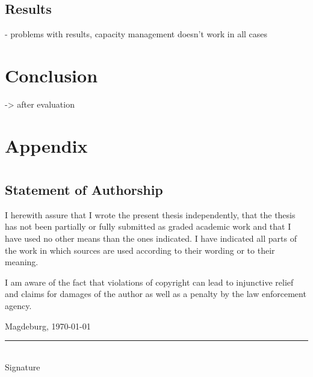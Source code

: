 \documentclass[
	12pt,
	a4paper,
	abstract,
	bibliography=totoc,
	chapterprefix,
	headings=openright,
	numbers=endperiod,
	parskip=half,
	twoside,
]{scrreprt}
\begin{document}
\section{Results}

- problems with results, capacity management doesn't work in all cases

\chapter{Conclusion}
\label{cha:conclusion}

-> after evaluation








\appendix

\chapter{Appendix}
\label{cha:appendix}


\chapter*{}

\section*{Statement of Authorship}

I herewith assure that I wrote the present thesis independently, that the thesis has not been partially or fully submitted as graded academic work and that I have used no other means than the ones indicated.
I have indicated all parts of the work in which sources are used according to their wording or to their meaning.

I am aware of the fact that violations of copyright can lead to injunctive relief and claims for damages of the author as well as a penalty by the law enforcement agency.

\bigskip

Magdeburg, \today

\bigskip
\bigskip

\rule{0.5\textwidth}{0.5pt}\\
\hspace*{0.25em}Signature
\end{document}
